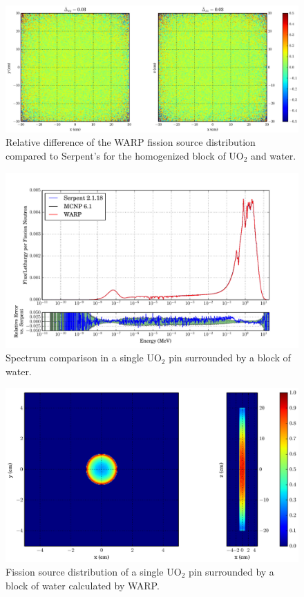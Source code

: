 \begin{figure}[h!]
\centering
\includegraphics[width=\textwidth,trim= 5cm 0cm 7cm 0cm]{graphics/finalresults/homfuel_fiss_diff-6.eps}
\caption{Relative difference of the WARP fission source distribution compared to Serpent's for the homogenized block of UO$_2$ and water. \label{homfuel_fiss_diff} }
\end{figure}

\begin{figure}[h!] 
\centering
\includegraphics[width=\textwidth,trim= 1cm 0cm 1cm 0cm]{graphics/finalresults/pincell_spec-6.pdf}
\caption{Spectrum comparison in a single UO$_2$ pin surrounded by a block of water. \label{pincell_spec} }
\end{figure}

\begin{figure}[h!]
\centering
\includegraphics[width=\textwidth,trim= 11cm 0cm 6cm 0cm]{graphics/finalresults/pincell_fiss-6.eps}
\caption{Fission source distribution of a single UO$_2$ pin surrounded by a block of water calculated by WARP. \label{pincell_fiss} }
\end{figure}

